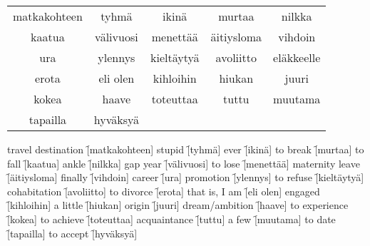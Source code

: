 
\begin{center}
  \begin{tabular}{|c c c c c|}
    \hline
    matkakohteen & tyhmä & ikinä & murtaa & nilkka  \\
    kaatua & välivuosi & menettää & äitiysloma & vihdoin \\
    ura & ylennys & kieltäytyä & avoliitto & eläkkeelle \\
    erota & eli olen & kihloihin & hiukan & juuri \\
    kokea & haave & toteuttaa & tuttu & muutama \\
    tapailla & hyväksyä &&& \\
    \hline
  \end{tabular}
\end{center}

\begin{questions}
  \begin{multicols}{3}
    \raggedcolumns
    \question travel destination \f[matkakohteen]
    \question stupid             \f[tyhmä]
    \question ever               \f[ikinä]
    \question to break           \f[murtaa]
    \question to fall            \f[kaatua]
    \question ankle              \f[nilkka]
    \question gap year           \f[välivuosi]
    \question to lose            \f[menettää]
    \question maternity leave    \f[äitiysloma]
    \question finally            \f[vihdoin]
    \question career             \f[ura]
    \question promotion          \f[ylennys]
    \question to refuse          \f[kieltäytyä]
    \question cohabitation       \f[avoliitto]
    \question to divorce         \f[erota]
    \question that is, I am      \f[eli olen]
    \question engaged            \f[kihloihin]
    \question a little           \f[hiukan]
    \question origin             \f[juuri]
    \question dream/ambition     \f[haave]
    \question to experience      \f[kokea]
    \question to achieve         \f[toteuttaa]
    \question acquaintance       \f[tuttu]
    \question a few              \f[muutama]
    \question to date            \f[tapailla]
    \question to accept          \f[hyväksyä]
  \end{multicols}
\end{questions}

